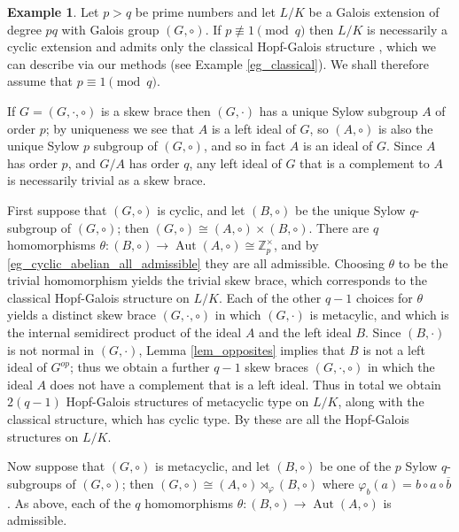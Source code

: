 \documentclass[12pt,a4paper, reqno]{amsart}
\theoremstyle{definition}
\newtheorem{example}[theorem]{Example}
\newcommand{\Z}{\mathbb{Z}}
\renewcommand{\bar}{\overline}
\DeclareMathOperator{\Aut}{\mbox{Aut}}
\begin{document}
\begin{example}
Let $ p>q $ be prime numbers and let $ L/K $ be a Galois extension of degree $ pq $ with Galois group $ (G,\circ) $. If $ p \not \equiv 1 \pmod{q} $ then $ L/K $ is necessarily a cyclic extension and admits only the classical Hopf-Galois structure \cite[Theorem 1]{By96}, which we can describe via our methods (see Example \ref{eg_classical}). We shall therefore assume that $ p \equiv 1 \pmod{q} $. 

If $ G=(G,\cdot,\circ) $ is a skew brace then $ (G,\cdot) $ has a unique Sylow subgroup $ A $ of order $ p $; by uniqueness we see that $ A $ is a left ideal of $ G $, so $ (A,\circ) $ is also the unique Sylow $ p $ subgroup of $ (G,\circ) $, and so in fact $ A $ is an ideal of $ G $. Since $ A $ has order $ p $, and $ G/A $ has order $ q $, any left ideal of $ G $ that is a complement to $ A $ is necessarily trivial as a skew brace. 

First suppose that $ (G,\circ) $ is cyclic, and let $ (B,\circ) $ be the unique Sylow $ q $-subgroup of $ (G,\circ) $; then $ (G,\circ) \cong (A,\circ) \times (B,\circ) $. There are $ q $ homomorphisms $ \theta: (B,\circ) \rightarrow \Aut(A,\circ) \cong \Z_{p}^{\times} $, and by \ref{eg_cyclic_abelian_all_admissible} they are all admissible. Choosing $ \theta $ to be the trivial homomorphism yields the trivial skew brace, which corresponds to the classical Hopf-Galois structure on $ L/K $. Each of the other $ q-1 $ choices for $ \theta $ yields a distinct skew brace $ (G,\cdot,\circ) $ in which $ (G,\cdot) $ is metacylic, and which is the internal semidirect product of the ideal $ A $ and the left ideal $ B $. Since $ (B,\cdot) $ is not normal in $ (G,\cdot) $, Lemma \ref{lem_opposites} implies that $ B $ is not a left ideal of $ G^{op} $; thus we obtain a further $ q-1 $ skew braces $ (G,\cdot,\circ) $ in which the ideal $ A $ does not have a complement that is a left ideal. Thus in total we obtain $ 2(q-1) $ Hopf-Galois structures of metacyclic type on $ L/K $, along with the classical structure, which has cyclic type. By \cite[Theorem 6.1]{By04c} these are all the Hopf-Galois structures on $ L/K $. 

Now suppose that $ (G,\circ) $ is metacyclic, and let $ (B,\circ) $ be one of the $ p $ Sylow $ q $-subgroups of $ (G,\circ) $; then $ (G,\circ) \cong (A,\circ) \rtimes_{\varphi} (B,\circ) $ where $ \varphi_{b}(a) = b \circ a \circ \bar{b} $. As above, each of the $ q $ homomorphisms $ \theta: (B,\circ) \rightarrow \Aut(A,\circ) $ is admissible. 


\end{example}
\end{document}
